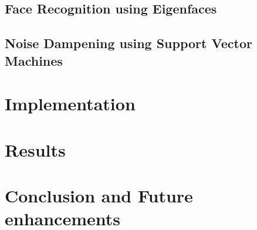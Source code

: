 \documentclass[%
        final,
        notitlepage,
        narroweqnarray,
        inline,
        ]{ieee}
\begin{document}
\subsection{Face Recognition using Eigenfaces}

\subsection{Noise Dampening using Support Vector Machines}

\section{Implementation}


\section{Results}


\section{Conclusion and Future enhancements}






\end{document}
